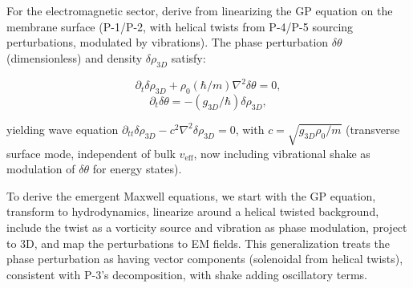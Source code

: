 For the electromagnetic sector, derive from linearizing the GP equation on the membrane surface (P-1/P-2, with helical twists from P-4/P-5 sourcing perturbations, modulated by vibrations). The phase perturbation $\delta \theta$ (dimensionless) and density $\delta \rho_{3D}$ satisfy:

\begin{equation}
\partial_t \delta \rho_{3D} + \rho_0 (\hbar / m) \nabla^2 \delta \theta = 0,
\end{equation}
\begin{equation}
\partial_t \delta \theta = - (g_{3D} / \hbar) \delta \rho_{3D},
\end{equation}

yielding wave equation $\partial_{tt} \delta \rho_{3D} - c^2 \nabla^2 \delta \rho_{3D} = 0$, with $c = \sqrt{g_{3D} \rho_0 / m}$ (transverse surface mode, independent of bulk $v_{\text{eff}}$, now including vibrational shake as modulation of $\delta \theta$ for energy states).

To derive the emergent Maxwell equations, we start with the GP equation, transform to hydrodynamics, linearize around a helical twisted background, include the twist as a vorticity source and vibration as phase modulation, project to 3D, and map the perturbations to EM fields. This generalization treats the phase perturbation as having vector components (solenoidal from helical twists), consistent with P-3's decomposition, with shake adding oscillatory terms.

